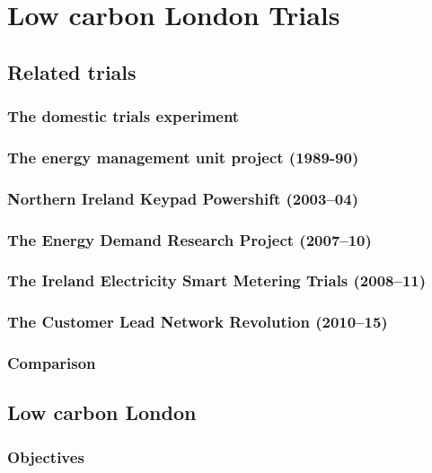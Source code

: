 \chapter{Low carbon London Trials}

\section{Related trials}
\subsection{The domestic trials experiment}

\subsection{The energy management unit project (1989-90)}

\subsection{Northern Ireland Keypad Powershift (2003–04)}

\subsection{The Energy Demand Research Project (2007–10)}

\subsection{The Ireland Electricity Smart Metering Trials (2008–11)}

\subsection{The Customer Lead Network Revolution (2010–15)}


\subsection{Comparison}


\section{Low carbon London}
\subsection{Objectives}

